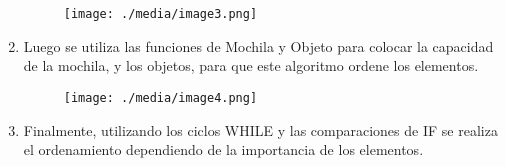 \documentclass[12pt]{article}
\renewcommand{\_}{\kern-1.5pt\textunderscore\kern-1.5pt}
\begin{document}
\begin{enumerate}

\begin{figure}[H]
	\begin{Center}
		\texttt{[image: ./media/image3.png]}
	\end{Center}
\end{figure}



\par

	\item Luego se utiliza las funciones de Mochila y Objeto para colocar la capacidad de la mochila, y los objetos, para que este algoritmo ordene los elementos.\par




\begin{figure}[H]
	\begin{Center}
		\texttt{[image: ./media/image4.png]}
	\end{Center}
\end{figure}



\par


\vspace{\baselineskip}

\vspace{\baselineskip}

\vspace{\baselineskip}

\vspace{\baselineskip}

\vspace{\baselineskip}

\vspace{\baselineskip}
	\item Finalmente, utilizando los ciclos WHILE y las comparaciones de IF se realiza el ordenamiento dependiendo de la importancia de los elementos.
\end{enumerate}\par



\end{document}
